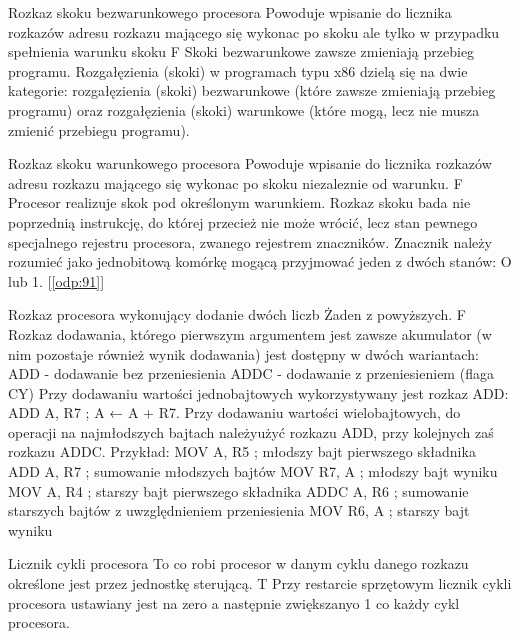 \label{odp:101}
\answer
{Rozkaz skoku bezwarunkowego procesora}
{Powoduje wpisanie do licznika rozkazów adresu rozkazu mającego się wykonac po skoku ale tylko w przypadku spełnienia warunku skoku}
{F}
{
Skoki bezwarunkowe zawsze zmieniają przebieg programu.
}
{
Rozgałęzienia (skoki) w programach typu x86 dzielą się na dwie kategorie: rozgałęzienia (skoki) bezwarunkowe (które zawsze zmieniają przebieg programu) oraz rozgałęzienia (skoki) warunkowe (które mogą, lecz nie musza zmienić przebiegu programu).
}

\label{odp:102}
\answer
{Rozkaz skoku warunkowego procesora}
{Powoduje wpisanie do licznika rozkazów adresu rozkazu mającego się wykonac po skoku niezaleznie od warunku.}
{F}
{
Procesor realizuje skok pod określonym warunkiem. Rozkaz skoku bada nie poprzednią instrukcję, do której przecież nie może wrócić, lecz stan pewnego specjalnego rejestru procesora, zwanego rejestrem znaczników.
}
{
Znacznik należy rozumieć jako jednobitową komórkę mogącą przyjmować jeden z dwóch stanów: O lub 1.
[\ref{odp:91}]
}

\label{odp:103}
\answer
{Rozkaz procesora wykonujący dodanie dwóch liczb}
{Żaden z powyższych.}
{F}
{
Rozkaz dodawania, którego pierwszym argumentem jest zawsze akumulator (w nim pozostaje również wynik dodawania) jest dostępny w dwóch wariantach:
ADD - dodawanie bez przeniesienia
ADDC - dodawanie z przeniesieniem (flaga CY)
}
{
Przy dodawaniu wartości jednobajtowych wykorzystywany jest rozkaz ADD:
ADD A, R7 ; A ← A + R7.
Przy dodawaniu wartości wielobajtowych, do operacji na najmłodszych bajtach należyużyć rozkazu ADD, przy kolejnych zaś rozkazu ADDC. Przykład:
MOV A, R5 ; młodszy bajt pierwszego składnika
ADD A, R7 ; sumowanie młodszych bajtów
MOV R7, A ; młodszy bajt wyniku
MOV A, R4 ; starszy bajt pierwszego składnika
ADDC A, R6 ; sumowanie starszych bajtów z uwzględnieniem przeniesienia
MOV R6, A ; starszy bajt wyniku
}

\label{odp:104}
\answer
{Licznik cykli procesora}
{To co robi procesor w danym cyklu danego rozkazu określone jest przez jednostkę sterującą.}
{T}
{
Przy restarcie sprzętowym licznik cykli procesora ustawiany jest na zero a następnie zwiększanyo 1 co każdy cykl procesora.
}
{
}

